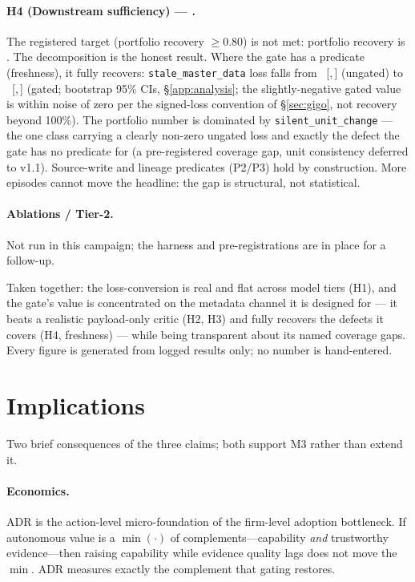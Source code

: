 \documentclass[11pt]{article}
\theoremstyle{plain}
\theoremstyle{definition}
\newcommand{\ci}[2]{~{\scriptsize[#1,\,#2]}}
\begin{document}
\paragraph{H4 (Downstream sufficiency) --- \ResHfour{}.}
The registered target (portfolio recovery $\ge 0.80$) is not met: portfolio recovery is
\HfourRecovery{}. The decomposition is the honest result. Where the gate has a predicate
(freshness), it fully recovers: \texttt{stale\_master\_data} loss falls from
\HfourStaleLossA{} \ci{\HfourStaleLossALo}{\HfourStaleLossAHi} (ungated) to \HfourStaleLossD{}
\ci{\HfourStaleLossDLo}{\HfourStaleLossDHi} (gated; bootstrap 95\% CIs, \S\ref{app:analysis};
the slightly-negative gated value
is within noise of zero per the signed-loss convention of \S\ref{sec:gigo}, not recovery
beyond 100\%). The portfolio number is dominated
by \texttt{silent\_unit\_change} --- the one class carrying a clearly non-zero ungated loss
and exactly the defect the gate has no predicate for (a pre-registered coverage gap, unit
consistency deferred to v1.1). Source-write and lineage predicates (P2/P3) hold by
construction. More episodes cannot move the headline: the gap is structural, not statistical.

\paragraph{Ablations / Tier-2.} Not run in this campaign; the harness and
pre-registrations are in place for a follow-up.

\medskip\noindent
Taken together: the loss-conversion is real and flat across model tiers (H1), and the gate's
value is concentrated on the metadata channel it is designed for --- it beats a realistic
payload-only critic (H2, H3) and fully recovers the defects it covers (H4, freshness) --- while
being transparent about its named coverage gaps. Every figure is generated from logged results
only; no number is hand-entered.

\section{Implications}\label{sec:implications}
Two brief consequences of the three claims; both support M3 rather than extend it.
\paragraph{Economics.} ADR is the action-level micro-foundation of the firm-level
adoption bottleneck. If autonomous value is a $\min(\cdot)$ of complements---capability
\emph{and} trustworthy evidence---then raising capability while evidence quality lags
does not move the $\min$. ADR measures exactly the complement that gating restores.
\end{document}
